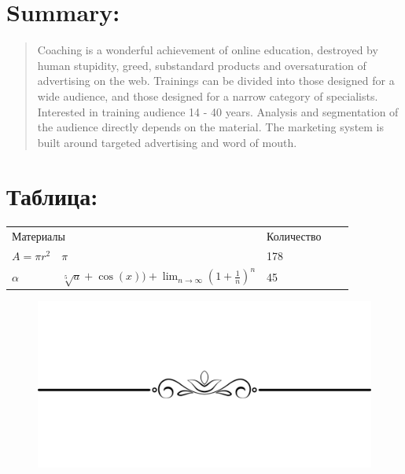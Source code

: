 \documentclass{article}
\begin{document}
\section{Summary:}
\begin{quote}
    Coaching is a wonderful achievement of online education, destroyed by human stupidity, greed, substandard products and oversaturation of advertising on the web. Trainings can be divided into those designed for a wide audience, and those designed for a narrow category of specialists. Interested in training audience 14 - 40 years. Analysis and segmentation of the audience directly depends on the material. The marketing system is built around targeted advertising and word of mouth. 
\end{quote}

\section*{Таблица:}
\begin{table}[ht]
\begin{tabular}{|ll|l|ll}
\cline{1-3}
\multicolumn{2}{|l|}{Материалы} & Количество &  &  \\ \cline{1-3}
\multicolumn{1}{|l|}{\(\displaystyle A =\pi r^{2} \) }   & {\(\displaystyle \pi  \) }    & 178        &  &  \\ \cline{1-3}
\multicolumn{1}{|l|}{\(\alpha \) }    & {\(\displaystyle \sqrt[5]{a} + \cos(x)) + \lim_{n\rightarrow \infty } (1 + \frac{1}{n})^{n} \) }    & 45         &  &  \\ \cline{1-3}
\end{tabular}
\end{table}


\begin{figure}[ht]
\includegraphics[width=1\textwidth]{divider.png}
\end{figure}
\end{document}
